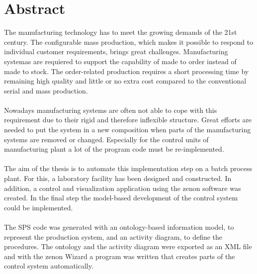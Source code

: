 \chapter*{Abstract}

The manufacturing technology has to meet the growing demands of the 21st century. The configurable mass production, which makes it possible to respond to individual customer requirements, brings great challenges. Manufacturing systemas are requiered to support the capability of made to order instead of made to stock. The order-related production requires a short processing time by remaining high quality and little or no extra cost compared to the conventional serial and mass production. \\\\
Nowadays manufacturing systems are often not able to cope with this requirement due to their rigid and therefore inflexible structure. Great efforts are needed to put the system in a new composition when parts of the manufacturing systems are removed or changed. Especially for the control units of manufacturing plant a lot of the program code must be re-implemented.\\\\
The aim of the thesis is to automate this implementation step on a batch process plant. For this, a laboratory facility has been designed and constructed. In addition, a control and visualization application using the zenon software was created. In the final step the model-based development of the control system could be implemented.\\\\
The SPS code was generated with an ontology-based information model, to represent the production system, and an activity diagram, to define the procedures. The ontology and the activity diagram were exported as an XML file and with the zenon Wizard a program was written that creates parts of the control system automatically.